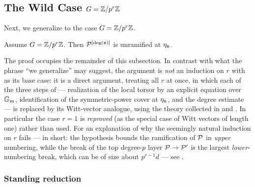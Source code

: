\subsection{\texorpdfstring{The Wild Case $G = \mathbb{Z}/p^r\mathbb{Z}$}{The Wild Case G = Z/p\^{}rZ}}\label{subsection:wild_case_Zpr}

Next, we generalize to the case $G = \mathbb{Z}/p^r\mathbb{Z}$.

\begin{theorem}\label{theorem:ramification_after_blowup_is_tame_for_p_power}
    Assume $G=\mathbb{Z}/p^r\mathbb{Z}$. Then $\mathcal{P}^{[\deg (\mathfrak{n})]}$ is unramified at $\eta_{\mathfrak{n}}$.
\end{theorem}

The proof occupies the remainder of this subsection. In contrast with what the phrase
``we generalize'' may suggest, the argument is \emph{not} an induction on $r$ with
 as its base case: it is a direct
argument, treating all $r$ at once, in which each of the three steps of
 --- realization of
the local torsor by an explicit equation over $\mathbb{G}_m$, identification of the
symmetric-power cover at $\eta_{\mathfrak{n}}$, and the degree estimate --- is replaced by its
Witt-vector analogue, using the theory collected in
 and
. In particular the case $r=1$ is
\emph{reproved} (as the special case of Witt vectors of length one) rather than used.
For an explanation of why the seemingly natural induction on $r$ fails --- in short:
the hypothesis bounds the ramification of $\mathcal{P}$ in \emph{upper} numbering, while the
break of the top degree-$p$ layer $\mathcal{P} \to \mathcal{P}'$ is the largest \emph{lower}-numbering
break, which can be of size about $p^{r-1}d$ --- see .

\subsubsection*{Standing reduction}

